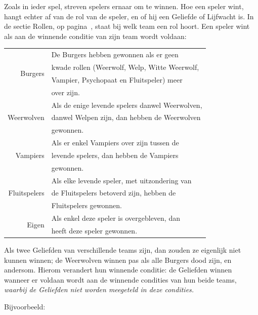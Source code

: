 \documentclass[12pt]{article}
\begin{document}
    Zoals in ieder spel, streven spelers ernaar om te winnen. Hoe een speler wint, hangt echter af van de rol van de speler, en of hij een Geliefde of Lijfwacht is. In de sectie Rollen, op pagina~\pageref{subsec:rollen}, staat bij welk team een rol hoort. Een speler wint als aan de winnende conditie van zijn team wordt voldaan:
    
    \begin{center}
      \begin{tabular}{r|l}
	\multirow{4}{*}{Burgers}
	 & De Burgers hebben gewonnen als er geen \\
	 & kwade rollen (Weerwolf, Welp, Witte Weerwolf, \\
	 & Vampier, Psychopaat en Fluitspeler) meer \\
	 & over zijn. \\
	\hline
	\multirow{3}{*}{Weerwolven}
	 & Als de enige levende spelers danwel Weerwolven, \\
	 & danwel Welpen zijn, dan hebben de Weerwolven \\
	 & gewonnen. \\
	\hline
	\multirow{3}{*}{Vampiers}
	 & Als er enkel Vampiers over zijn tussen de \\
	 & levende spelers, dan hebben de Vampiers \\
	 & gewonnen. \\
	\hline
	\multirow{3}{*}{Fluitspelers}
	 & Als elke levende speler, met uitzondering van \\
	 & de Fluitspelers betoverd zijn, hebben de \\
	 & Fluitspelers gewonnen. \\
	\hline
	\multirow{2}{*}{Eigen} 
	 & Als enkel deze speler is overgebleven, dan \\
	 & heeft deze speler gewonnen. \\
      \end{tabular}
    \end{center}
    
    Als twee Geliefden van verschillende teams zijn, dan zouden ze eigenlijk niet kunnen winnen; de Weerwolven winnen pas als alle Burgers dood zijn, en andersom. Hierom verandert hun winnende conditie: de Geliefden winnen wanneer er voldaan wordt aan de winnende condities van hun beide teams, \emph{waarbij de Geliefden niet worden meegeteld in deze condities.}
    
    Bijvoorbeeld:
\end{document}
